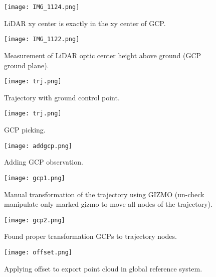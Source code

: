 \begin{figure}[H]
	\centering
	\texttt{[image: IMG\_1124.png]}
	\caption{LiDAR xy center is exactly in the xy center of GCP.}
	\label{fig:GCP5}
\end{figure}



\begin{figure}[H]
	\centering
	\texttt{[image: IMG\_1122.png]}
	\caption{Measurement of LiDAR optic center height above ground (GCP ground plane).}
	\label{fig:GCP6}
\end{figure}

\begin{figure}[H]
	\centering
	\texttt{[image: trj.png]}
	\caption{Trajectory with ground control point. }
	\label{fig:trj}
\end{figure}

\begin{figure}[H]
	\centering
	\texttt{[image: trj.png]}
	\caption{GCP picking.}
	\label{fig:picking}
\end{figure}

\begin{figure}[H]
	\centering
	\texttt{[image: addgcp.png]}
	\caption{Adding GCP observation.}
	\label{fig:addgcp}
\end{figure}

\begin{figure}[H]
	\centering
	\texttt{[image: gcp1.png]}
	\caption{Manual transformation of the trajectory using GIZMO (un-check manipulate only marked gizmo to move all nodes of the trajectory).}
	\label{fig:gcp1}
\end{figure}

\begin{figure}[H]
	\centering
	\texttt{[image: gcp2.png]}
	\caption{Found proper transformation GCPs to trajectory nodes.}
	\label{fig:gcp2}
\end{figure}

\begin{figure}[H]
	\centering
	\texttt{[image: offset.png]}
	\caption{Applying offset to export point cloud in global reference system.}
	\label{fig:offset}
\end{figure}


